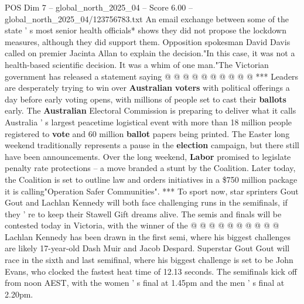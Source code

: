 \begin{textsample}{POS Dim 7 – global\_north\_2025\_04 – Score 6.00 – global\_north\_2025\_04/123756783.txt}
An email exchange between some of the state ' s most senior health officials* shows they did not propose the lockdown measures, although they did support them.
Opposition spokesman David Davis called on premier Jacinta Allan to explain the decision."In this case, it was not a health-based scientific decision.
It was a whim of one man."The Victorian government has released a statement saying @ @ @ @ @ @ @ @ @ @ *** Leaders are desperately trying to win over \textbf{Australian} \textbf{voters} with political offerings a day before early voting opens, with millions of people set to cast their \textbf{ballots} early.
The \textbf{Australian} Electoral Commission is preparing to deliver what it calls Australia ' s largest peacetime logistical event with more than 18 million people registered to \textbf{vote} and 60 million \textbf{ballot} papers being printed.
The Easter long weekend traditionally represents a pause in the \textbf{election} campaign, but there still have been announcements.
Over the long weekend, \textbf{Labor} promised to legislate penalty rate protections -- a move branded a stunt by the Coalition.
Later today, the Coalition is set to outline law and orders initiatives in a \$750 million package it is calling"Operation Safer Communities". *** To sport now, star sprinters Gout Gout and Lachlan Kennedy will both face challenging runs in the semifinals, if they ' re to keep their Stawell Gift dreams alive.
The semis and finals will be contested today in Victoria, with the winner of the @ @ @ @ @ @ @ @ @ @ Lachlan Kennedy has been drawn in the first semi, where his biggest challenges are likely 17-year-old Dash Muir and Jacob Despard.
Superstar Gout Gout will race in the sixth and last semifinal, where his biggest challenge is set to be John Evans, who clocked the fastest heat time of 12.13 seconds.
The semifinals kick off from noon AEST, with the women ' s final at 1.45pm and the men ' s final at 2.20pm.

\end{textsample}
